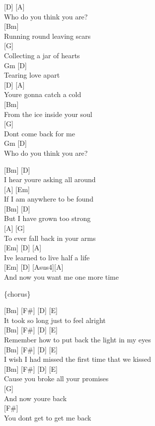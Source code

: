\documentclass[
  letterpaper,
]{scrbook}
\begin{document}
{[}D{]} {[}A{]}\\
Who do you think you are?\\
{[}Bm{]}\\
Running \textquotesingle round leaving scars\\
{[}G{]}\\
Collecting a jar of hearts\\
Gm {[}D{]}\\
Tearing love apart\\
{[}D{]} {[}A{]}\\
You\textquotesingle re gonna catch a cold\\
{[}Bm{]}\\
From the ice inside your soul\\
{[}G{]}\\
Don\textquotesingle t come back for me\\
Gm {[}D{]}\\
Who do you think you are?

{[}Bm{]} {[}D{]}\\
I hear you\textquotesingle re asking all around\\
{[}A{]} {[}Em{]}\\
If I am anywhere to be found\\
{[}Bm{]} {[}D{]}\\
But I have grown too strong\\
{[}A{]} {[}G{]}\\
To ever fall back in your arms\\
{[}Em{]} {[}D{]} {[}A{]}\\
I\textquotesingle ve learned to live half a life\\
{[}Em{]} {[}D{]} {[}Asus4{]}{[}A{]}\\
And now you want me one more time

\{chorus\}

{[}Bm{]} {[}F\#{]} {[}D{]} {[}E{]}\\
It took so long just to feel alright\\
{[}Bm{]} {[}F\#{]} {[}D{]} {[}E{]}\\
Remember how to put back the light in my eyes\\
{[}Bm{]} {[}F\#{]} {[}D{]} {[}E{]}\\
I wish I had missed the first time that we kissed\\
{[}Bm{]} {[}F\#{]} {[}D{]} {[}E{]}\\
\textquotesingle Cause you broke all your promises\\
{[}G{]}\\
And now you\textquotesingle re back\\
{[}F\#{]}\\
You don\textquotesingle t get to get me back
\end{document}
